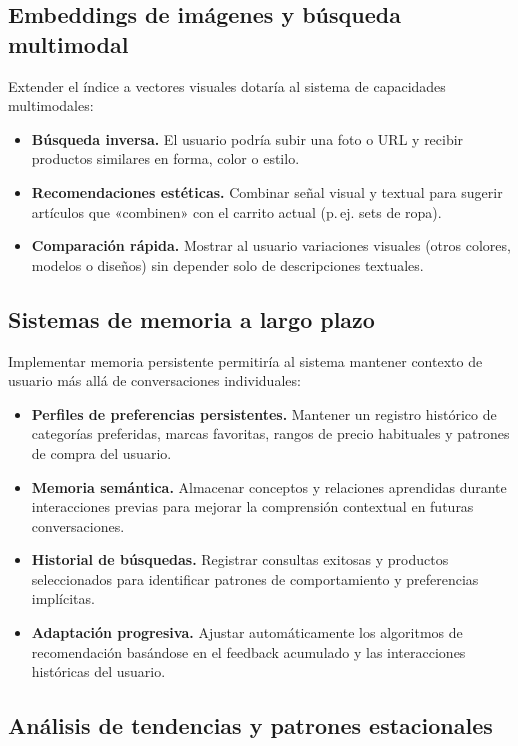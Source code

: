 \subsection{Embeddings de imágenes y búsqueda multimodal}

Extender el índice a vectores visuales dotaría al sistema de capacidades multimodales:

\begin{itemize}
    \item \textbf{Búsqueda inversa.} El usuario podría subir una foto o URL y recibir productos similares en forma, color o estilo.
    \item \textbf{Recomendaciones estéticas.} Combinar señal visual y textual para sugerir artículos que «combinen» con el carrito actual (p.\,ej. sets de ropa).
    \item \textbf{Comparación rápida.} Mostrar al usuario variaciones visuales (otros colores, modelos o diseños) sin depender solo de descripciones textuales.
\end{itemize}

\subsection{Sistemas de memoria a largo plazo}

Implementar memoria persistente permitiría al sistema mantener contexto de usuario más allá de conversaciones individuales:

\begin{itemize}
    \item \textbf{Perfiles de preferencias persistentes.} Mantener un registro histórico de categorías preferidas, marcas favoritas, rangos de precio habituales y patrones de compra del usuario.
    \item \textbf{Memoria semántica.} Almacenar conceptos y relaciones aprendidas durante interacciones previas para mejorar la comprensión contextual en futuras conversaciones.
    \item \textbf{Historial de búsquedas.} Registrar consultas exitosas y productos seleccionados para identificar patrones de comportamiento y preferencias implícitas.
    \item \textbf{Adaptación progresiva.} Ajustar automáticamente los algoritmos de recomendación basándose en el feedback acumulado y las interacciones históricas del usuario.
\end{itemize}

\subsection{Análisis de tendencias y patrones estacionales}

